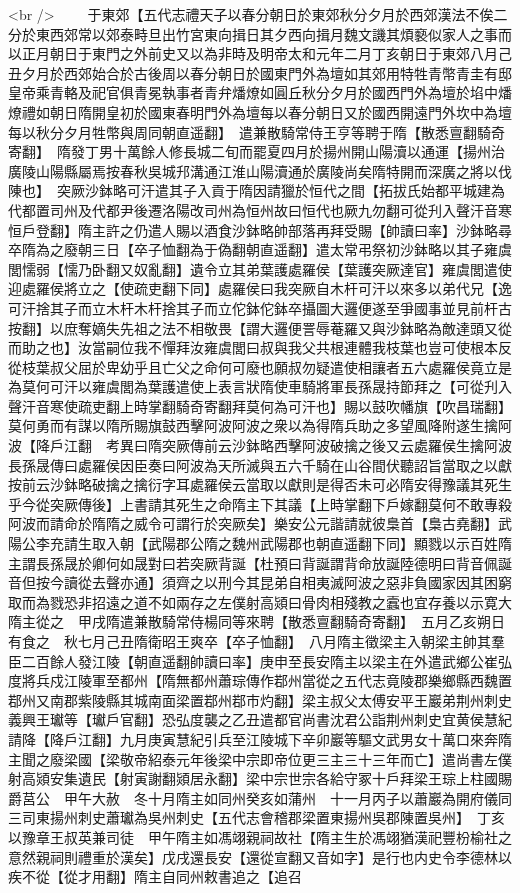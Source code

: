 <br />
　　于東郊【五代志禮天子以春分朝日於東郊秋分夕月於西郊漢法不俟二分於東西郊常以郊泰畤旦出竹宮東向揖日其夕西向揖月魏文譏其煩褻似家人之事而以正月朝日于東門之外前史又以為非時及明帝太和元年二月丁亥朝日于東郊八月己丑夕月於西郊始合於古後周以春分朝日於國東門外為壇如其郊用特牲青幣青圭有邸皇帝乘青輅及祀官俱青冕執事者青弁燔燎如圓丘秋分夕月於國西門外為壇於埳中燔燎禮如朝日隋開皇初於國東春明門外為壇每以春分朝日又於國西開遠門外坎中為壇每以秋分夕月牲幣與周同朝直遥翻】　遣兼散騎常侍王亨等聘于隋【散悉亶翻騎奇寄翻】　隋發丁男十萬餘人修長城二旬而罷夏四月於揚州開山陽瀆以通運【揚州治廣陵山陽縣屬焉按春秋吳城䢴溝通江淮山陽瀆通於廣陵尚矣隋特開而深廣之將以伐陳也】　突厥沙鉢略可汗遣其子入貢于隋因請獵於恒代之間【拓拔氏始都平城建為代都置司州及代都尹後遷洛陽改司州為恒州故曰恒代也厥九勿翻可從刋入聲汗音寒恒戶登翻】隋主許之仍遣人賜以酒食沙鉢略帥部落再拜受賜【帥讀曰率】沙鉢略尋卒隋為之廢朝三日【卒子恤翻為于偽翻朝直遥翻】遣太常弔祭初沙鉢略以其子雍虞閭懦弱【懦乃卧翻又奴亂翻】遺令立其弟葉護處羅侯【葉護突厥達官】雍虞閭遣使迎處羅侯將立之【使疏吏翻下同】處羅侯曰我突厥自木杆可汗以來多以弟代兄【逸可汗捨其子而立木杆木杆捨其子而立佗鉢佗鉢卒攝圖大邏便遂至爭國事並見前杆古按翻】以庶奪嫡失先祖之法不相敬畏【謂大邏便詈辱菴羅又與沙鉢略為敵達頭又從而助之也】汝當嗣位我不憚拜汝雍虞閭曰叔與我父共根連體我枝葉也豈可使根本反從枝葉叔父屈於卑幼乎且亡父之命何可廢也願叔勿疑遣使相讓者五六處羅侯竟立是為莫何可汗以雍虞閭為葉護遣使上表言狀隋使車騎將軍長孫晟持節拜之【可從刋入聲汗音寒使疏吏翻上時掌翻騎奇寄翻拜莫何為可汗也】賜以鼓吹幡旗【吹昌瑞翻】莫何勇而有謀以隋所賜旗鼓西擊阿波阿波之衆以為得隋兵助之多望風降附遂生擒阿波【降戶江翻　考異曰隋突厥傳前云沙鉢略西擊阿波破擒之後又云處羅侯生擒阿波長孫晟傳曰處羅侯因臣奏曰阿波為天所滅與五六千騎在山谷間伏聽詔旨當取之以獻按前云沙鉢略破擒之擒衍字耳處羅侯云當取以獻則是得否未可必隋安得豫議其死生乎今從突厥傳後】上書請其死生之命隋主下其議【上時掌翻下戶嫁翻莫何不敢專殺阿波而請命於隋隋之威令可謂行於突厥矣】樂安公元諧請就彼梟首【梟古堯翻】武陽公李充請生取入朝【武陽郡公隋之魏州武陽郡也朝直遥翻下同】顯戮以示百姓隋主謂長孫晟於卿何如晟對曰若突厥背誕【杜預曰背誕謂背命放誕陸德明曰背音佩誕音但按今讀從去聲亦通】須齊之以刑今其昆弟自相夷滅阿波之惡非負國家因其困窮取而為戮恐非招遠之道不如兩存之左僕射高熲曰骨肉相殘教之蠧也宜存養以示寛大隋主從之　甲戌隋遣兼散騎常侍楊同等來聘【散悉亶翻騎奇寄翻】　五月乙亥朔日有食之　秋七月己丑隋衛昭王爽卒【卒子恤翻】　八月隋主徵梁主入朝梁主帥其羣臣二百餘人發江陵【朝直遥翻帥讀曰率】庚申至長安隋主以梁主在外遣武鄉公崔弘度將兵戍江陵軍至都州【隋無都州蕭琮傳作鄀州當從之五代志竟陵郡樂鄉縣西魏置鄀州又南郡紫陵縣其城南面梁置鄀州鄀市灼翻】梁主叔父太傅安平王巖弟荆州刺史義興王瓛等【瓛戶官翻】恐弘度襲之乙丑遣都官尚書沈君公詣荆州刺史宜黄侯慧紀請降【降戶江翻】九月庚寅慧紀引兵至江陵城下辛卯巖等驅文武男女十萬口來奔隋主聞之廢梁國【梁敬帝紹泰元年後梁中宗即帝位更三主三十三年而亡】遣尚書左僕射高熲安集遺民【射寅謝翻熲居永翻】梁中宗世宗各給守冢十戶拜梁王琮上柱國賜爵莒公　甲午大赦　冬十月隋主如同州癸亥如蒲州　十一月丙子以蕭巖為開府儀同三司東揚州刺史蕭瓛為吳州刺史【五代志會稽郡梁置東揚州吳郡陳置吳州】　丁亥以豫章王叔英兼司徒　甲午隋主如馮翊親祠故社【隋主生於馮翊猶漢祀豐枌榆社之意然親祠則禮重於漢矣】戊戌還長安【還從宣翻又音如字】是行也内史令李德林以疾不從【從才用翻】隋主自同州敕書追之【追召